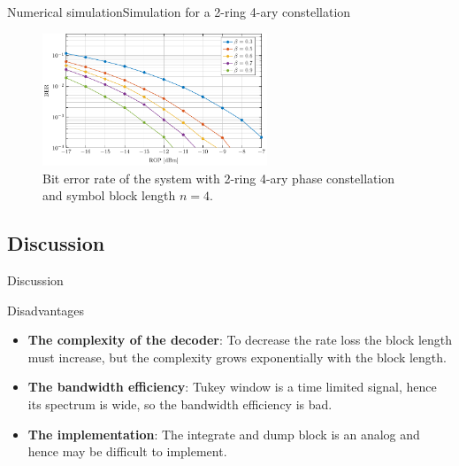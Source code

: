 \documentclass[en]{sdqbeamer}
\begin{document}
\begin{frame}{Numerical simulation}{Simulation for a 2-ring 4-ary constellation}
\begin{figure}
\begin{center}
\includegraphics[width=0.6\textwidth]{Tukey_result_BER.pdf}
\caption{Bit error rate of the system with 2-ring 4-ary phase constellation and symbol block length $n=4$.}
\label{fig:Tukey_result_BER}
\end{center}
\end{figure}

\end{frame}



\subsection{Discussion}


\begin{frame}{Discussion}{}
\begin{greenblock}{Disadvantages}
		
\begin{itemize}

\item \textbf{The complexity of the decoder}: To decrease the rate loss the block length must increase, but the complexity grows exponentially with the block length.
\item \textbf{The bandwidth efficiency}: Tukey window is a time limited signal, hence its spectrum is wide, so the bandwidth efficiency is bad.
\item \textbf{The implementation}: The integrate and dump block is an analog and hence may be difficult to implement.

\end{itemize}
\end{greenblock}
		
\end{frame}



\end{document}
